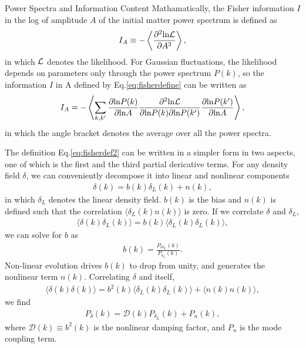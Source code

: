 \begin{section}{Power Spectra and Information Content}
  Mathamatically, the Fisher information \cite{bib:Tegmark1997} $I$ in
  the log of amplitude $A$ of the initial matter power spectrum is
  defined as
  \begin{align}
    I_A \equiv -\left\langle \frac{\partial ^2 \mathrm{ln \mathcal{L}}}{\partial A ^2}\right\rangle,
    \label{eq:fisherdefine}
  \end{align}
  in which $\mathcal{L}$ denotes the likelihood.  For Gaussian
  fluctuations, the likelihood depends on parameters only through the
  power spectrum $P(k)$, so the information $I$ in A defined by
  Eq.\ref{eq:fisherdefine} can be written as \cite{bib:Rimes2006}
  \begin{align}
    I_A = - \left\langle \sum_{k,k'} \frac{\partial \mathrm{ln} P(k)}{\partial \mathrm{ln} A} 
    \frac{\partial ^2 \mathrm{ln \mathcal{L}}}{\partial \mathrm{ln} P(k) \partial \mathrm{ln} P(k')}
    \frac{\partial \mathrm{ln} P(k')}{\partial \mathrm{ln} A}\right\rangle,
    \label{eq:fisherdef2}
  \end{align}
  in which the angle bracket denotes the average over all the power
  spectra.

  The definition Eq.\ref{eq:fisherdef2} can be written in a simpler
  form in two aspects, one of which is the first and the third partial
  dericative terms.  For any density field $\delta$, we can
  conveniently decompose it into linear and nonlinear components
  \begin{align}
    \delta (k) = b (k) \delta _L (k) + n (k),
    \label{eq:decompose}
  \end{align}
  in which $\delta_L$ denotes the linear density field. $b (k)$ is the
  bias and $n (k)$ is defined such that the correlation
  $\langle \delta_L (k) n (k) \rangle$ is zero.  If we correlate
  $\delta$ and $\delta_L$,
  \begin{align}
    \langle \delta (k) \delta_L (k) \rangle = b (k) \langle \delta_L (k) \delta_L (k) \rangle,
    \label{eq:correlating}
  \end{align} 
  we can solve for $b$ as
  \begin{align}
    b (k) = \frac{P _{\delta \delta_L}(k)}{P_{\delta_L}(k)}.
    \label{eq:bofk}
  \end{align}
  Non-linear evolution drives $b (k)$ to drop from unity, and
  generates the nonlinear term $n (k)$.  Correlating $\delta$ and
  itself,
  \begin{align}
    \langle \delta (k) \delta (k) \rangle = 
    b^2 (k) \langle \delta_L (k) \delta_L (k) \rangle + \langle n(k)n(k) \rangle,
  \end{align}
  we find
  \begin{align}
    P_\delta (k) = \mathcal{D} (k) P_{\delta_L} (k) + P_n (k),
    \label{eq:powerdecompose}
  \end{align}
  where $\mathcal{D}(k) \equiv b^2 (k)$ is the nonlinear damping
  factor, and $P_n$ is the mode coupling term.


\end{section}
